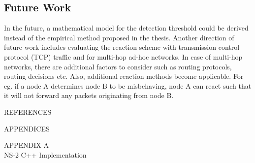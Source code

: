\documentclass[12pt,letterpaper,english]{article}
\begin{document}
\subsection{Future Work}
\indent In the future, a mathematical model for the detection threshold could be derived instead of the empirical method proposed	 in the thesis. Another direction of future work includes evaluating the reaction scheme with transmission control protocol (TCP) traffic and for multi-hop ad-hoc networks.
In case of multi-hop networks, there are additional factors to consider such as routing protocols, routing decisions etc. Also, additional reaction methods become applicable. For eg. if a node A determines node B to be misbehaving, node A can react such that it will not forward any packets originating from node B.
\newpage
\begin{center}
\vspace*{3.5in}
REFERENCES
\end{center}
\newpage
\singlespacing
\begin{center}
\printbibliography
\end{center}
\doublespacing
\clearpage
\newpage
\appendix
\begin{center}
\vspace*{3.5in}
APPENDICES
\end{center}
\newpage
\begin{center}APPENDIX A \\ NS-2 C++ Implementation \end{center}
\end{document}

